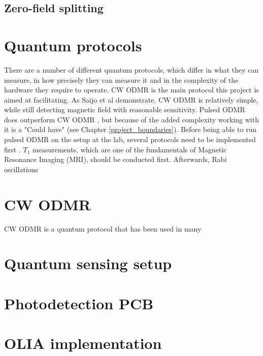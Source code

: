 \subsection{Zero-field splitting}


\section{Quantum protocols}
There are a number of different quantum protocols, which differ in what they can measure, in how precisely they can measure it and in the complexity of the hardware they require to operate. CW ODMR is the main protocol this project is aimed at facilitating. As Saijo et al \cite{saijo2018ac} demonstrate, CW ODMR is relatively simple, while still detecting magnetic field with reasonable sensitivity. Pulsed ODMR does outperform CW ODMR \cite{zhang2020high}, but because of the added complexity working with it is a "Could have" (see Chapter \ref{project_boundaries}). Before being able to run pulsed ODMR on the setup at the lab, several protocols need to be implemented first \cite{sewani2020coherent}. $T_1$ measurements, which are one of the fundamentals of Magnetic Resonance Imaging (MRI), should be conducted first. Afterwards, Rabi oscillations 

\section{CW ODMR}
CW ODMR is a quantum protocol that has been used in many 

\section{Quantum sensing setup}
\section{Photodetection PCB}
\section{OLIA implementation}
